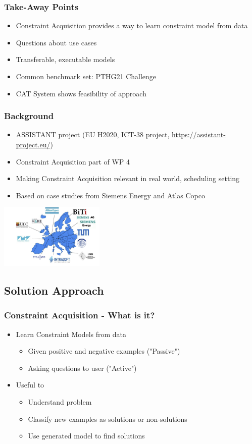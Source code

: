 \begin{frame}
\frametitle{Take-Away Points}
\begin{itemize}
\item Constraint Acquisition provides a way to learn constraint model from data
\item Questions about use cases
\item Transferable, executable models
\item Common benchmark set: PTHG21 Challenge
\item CAT System shows feasibility of approach
\end{itemize}
\end{frame}

\begin{frame}
\frametitle{Background}
\begin{itemize}
\item ASSISTANT project (EU H2020, ICT-38 project, \url{https://assistant-project.eu/})
\item Constraint Acquisition part of WP 4
\item Making Constraint Acquisition relevant in real world, scheduling setting
\item Based on case studies from Siemens Energy and Atlas Copco
\end{itemize}
\includegraphics[width=5cm]{imagescat/assistantpartners}
\end{frame}

\subsection{Solution Approach}
\begin{frame}
\frametitle{Constraint Acquisition - What is it?}
\begin{itemize}
\item Learn Constraint Models from data
\begin{itemize}
\item Given positive and negative examples ("Passive")
\item Asking questions to user ("Active")
\end{itemize}
\item Useful to
\begin{itemize}
\item Understand problem
\item Classify new examples as solutions or non-solutions
\item Use generated model to find solutions 
\end{itemize}
\end{itemize}
\end{frame}

